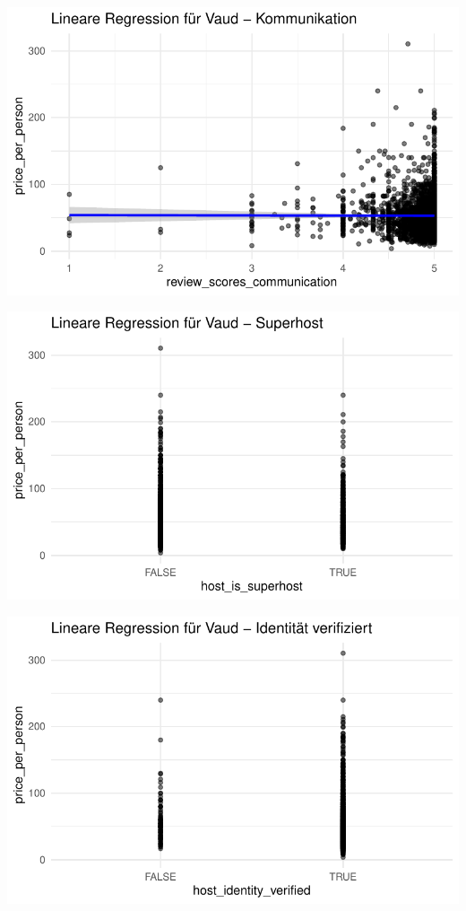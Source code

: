 \documentclass[
  journal,
]{IEEEtran}%
\begin{document}
\includegraphics{main_files/figure-pdf/unnamed-chunk-17-3.pdf}

\includegraphics{main_files/figure-pdf/unnamed-chunk-17-4.pdf}

\includegraphics{main_files/figure-pdf/unnamed-chunk-17-5.pdf}
\end{document}
